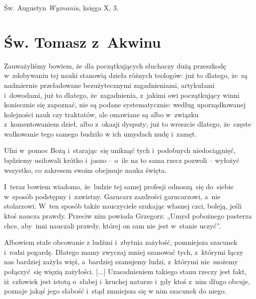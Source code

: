 \documentclass[a4paper,11pt]{article}
\newcommand{\attribA}[1]{#1}
\begin{document}
\attribA{Św. Augustyn \textit{Wyznania}, księga X, 3.}










\section{Św. Tomasz z~Akwinu}



Zauważyliśmy bowiem, że dla początkujących słuchaczy dużą przeszkodę
w~zdobywaniu tej nauki stanowią dzieła różnych teologów: już to
dlatego, że~są nadmiernie przeładowane bezużytecznymi zagadnieniami,
artykułami i~dowodami, już to dlatego, że~zagadnienia, z~jakimi owi
początkujący winni koniecznie się zapoznać, nie są podane
systematycznie: według uporządkowanej kolejności nauk czy traktatów,
ale omawiane są albo w~związku z~komentowaniem dzieł, albo z~okazji
dysputy; już to wreszcie dlatego, że~częste wałkowanie tego samego
budziło w ich umysłach nudę i~zamęt.

Ufni w~pomoc Bożą i~starając~się uniknąć tych i~podobnych
niedociągnięć, będziemy usiłowali krótko i~jasno -- o~ile na to sama
rzecz pozwoli -- wyłożyć wszystko, co zakresem swoim obejmuje nauka
święta.


\vspace{\spaceThree}



\noindent
I~teraz bowiem wiadomo, że~ludzie tej samej profesji odnoszą~się
do~siebie w~sposób podstępny i~zawistny. Garncarz zazdrości
garncarzowi, a~nie stolarzowi. W~ten sposób także nauczyciele szukając
własnej czci, boleją, jeśli ktoś naucza prawdy. Przeciw nim powiada
Grzegorz: „Umysł pobożnego pasterza chce, aby~inni nauczali prawdy,
której on sam nie jest w~stanie uczyć”.


\vspace{\spaceThree}



\noindent
Albowiem stałe obcowanie z ludźmi i~zbytnia zażyłość, pomniejsza
szacunek i~rodzi pogardę. Dlatego mamy zwyczaj mniej szanować tych,
z~którymi łączy nas bardziej zażyła więź, a~bardziej szanujemy ludzi,
z~którymi nie~możemy połączyć~się więzią zażyłości. [...]
Uzasadnieniem takiego stanu rzeczy jest fakt, iż~człowiek jest istotą
o~słabej i~kruchej naturze i~gdy ktoś z~nim długo obcuje, poznaje
jakąś jego słabość i~stąd zmniejsza się w nim szacunek do niego.
\end{document}
